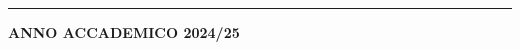 \begin{titlepage}
\begin{center}
    \rule{\linewidth}{0.4pt}

    

    {\large \textbf{ANNO ACCADEMICO 2024/25} \par}

    \vspace*{0.5cm}


                
    \end{center}
\end{titlepage}